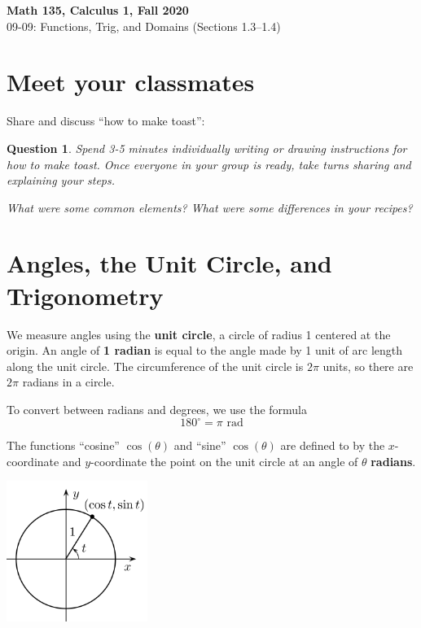 \documentclass[11pt,reqno,final]{amsart}
\numberwithin{equation}{section}
\numberwithin{figure}{section}
\newtheorem{question}{Question}
\theoremstyle{definition} %
\begin{document}
\begin{center}
        \textbf{\Large Math 135, Calculus 1, Fall 2020}\\[10pt]
        {\large 09-09: Functions, Trig, and Domains (Sections 1.3--1.4)}
\end{center}

\thispagestyle{empty}

\renewcommand{\thesection}{\Alph{section}}

\section{Meet your classmates}

Share and discuss ``how to make toast'':
\begin{question}
        Spend 3-5 minutes individually writing or drawing instructions for how to make toast.
        Once everyone in your group is ready, take turns sharing and explaining your steps.

        What were some common elements? What were some differences in your recipes?
\end{question}

\section{Angles, the Unit Circle, and Trigonometry}

We measure angles using the \textbf{unit circle}, a circle of radius 1 centered at the origin.
An angle of \textbf{1 radian} is equal to the angle made by 1 unit of arc length along the unit circle.
The circumference of the unit circle is $2 \pi$ units, so there are $2 \pi$ radians in a circle.

To convert between radians and degrees, we use the formula
\[
        180^\circ = \pi \mbox{ rad}
\]

\begin{minipage}{.48\textwidth}
        \begin{framed}
                The functions ``cosine'' $\cos(\theta) $ and ``sine'' $\cos(\theta)$
                are defined to by the $x$-coordinate and $y$-coordinate the point on the unit circle at an angle of $\theta$ \textbf{radians}.
        \end{framed}
\end{minipage}
\begin{minipage}{.48\textwidth}
        \begin{center}
                \includegraphics[width=1.8in]{09-09P_sincos.png}
        \end{center}
\end{minipage}
\end{document}
